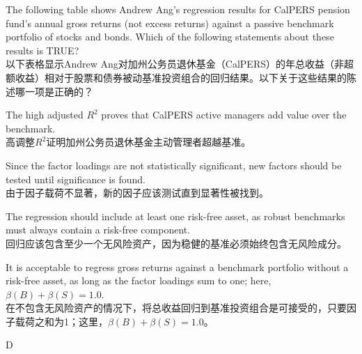 \documentclass{article}
\newcounter{question} %
\begin{document}
\begin{question}
    The following table shows Andrew Ang's regression results for CalPERS pension fund's annual gross returns (not excess returns) against a passive benchmark portfolio of stocks and bonds. Which of the following statements about these results is TRUE?\\
    以下表格显示Andrew Ang对加州公务员退休基金（CalPERS）的年总收益（非超额收益）相对于股票和债券被动基准投资组合的回归结果。以下关于这些结果的陈述哪一项是正确的？
\end{question}

\begin{choices}
    \item The high adjusted $R^2$ proves that CalPERS active managers add value over the benchmark.\\
    高调整$R^2$证明加州公务员退休基金主动管理者超越基准。
    \item Since the factor loadings are not statistically significant, new factors should be tested until significance is found.\\
    由于因子载荷不显著，新的因子应该测试直到显著性被找到。
    \item The regression should include at least one risk-free asset, as robust benchmarks must always contain a risk-free component.\\
    回归应该包含至少一个无风险资产，因为稳健的基准必须始终包含无风险成分。
    \item It is acceptable to regress gross returns against a benchmark portfolio without a risk-free asset, as long as the factor loadings sum to one; here, $\beta(B) + \beta(S) = 1.0$.\\
    在不包含无风险资产的情况下，将总收益回归到基准投资组合是可接受的，只要因子载荷之和为1；这里，$\beta(B) + \beta(S) = 1.0$。
\end{choices}

\begin{correctanswer}
    D
\end{correctanswer}
\end{document}
